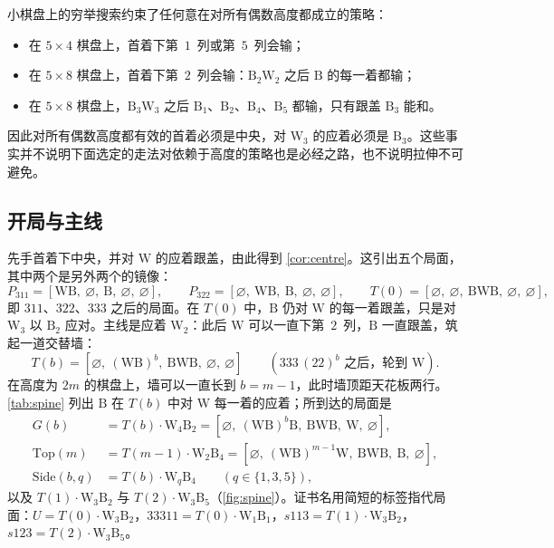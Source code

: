 \documentclass[11pt,a4paper]{article}
\theoremstyle{zhthm}
\newcommand{\B}{\mathrm{B}}
\newcommand{\W}{\mathrm{W}}
\newcommand{\col}[1]{[#1]}
\newcommand{\Top}{\mathrm{Top}}
\newcommand{\Side}{\mathrm{Side}}
\begin{document}
小棋盘上的穷举搜索约束了任何意在对所有偶数高度都成立的策略：
\begin{itemize}
  \item 在 $5\times 4$ 棋盘上，首着下第~$1$~列或第~$5$~列会输；
  \item 在 $5\times 8$ 棋盘上，首着下第~$2$~列会输：$\B_2\W_2$ 之后 $\B$ 的每一着都输；
  \item 在 $5\times 8$ 棋盘上，$\B_3\W_3$ 之后 $\B_1$、$\B_2$、$\B_4$、$\B_5$ 都输，只有跟盖 $\B_3$ 能和。
\end{itemize}
因此对所有偶数高度都有效的首着必须是中央，对 $\W_3$ 的应着必须是 $\B_3$。这些事实并不说明下面选定的走法对依赖于高度的策略也是必经之路，也不说明拉伸不可避免。

\subsection{开局与主线}

先手首着下中央，并对 $\W$ 的应着跟盖，由此得到 \cref{cor:centre}。这引出五个局面，其中两个是另外两个的镜像：
\[
  P_{311}=\col{\W\B,\ \varnothing,\ \B,\ \varnothing,\ \varnothing},\qquad
  P_{322}=\col{\varnothing,\ \W\B,\ \B,\ \varnothing,\ \varnothing},\qquad
  T(0)=\col{\varnothing,\ \varnothing,\ \B\W\B,\ \varnothing,\ \varnothing},
\]
即 $311$、$322$、$333$ 之后的局面。在 $T(0)$ 中，$\B$ 仍对 $\W$ 的每一着跟盖，只是对 $\W_3$ 以 $\B_2$ 应对。主线是应着 $\W_2$：此后 $\W$ 可以一直下第~$2$~列，$\B$ 一直跟盖，筑起一道交替墙：
\[
  T(b)=\col{\varnothing,\ (\W\B)^b,\ \B\W\B,\ \varnothing,\ \varnothing}\qquad(333\,(22)^b \text{ 之后，轮到 } \W).
\]
在高度为 $2m$ 的棋盘上，墙可以一直长到 $b=m-1$，此时墙顶距天花板两行。\cref{tab:spine} 列出 $\B$ 在 $T(b)$ 中对 $\W$ 每一着的应着；所到达的局面是
\begin{align*}
  G(b) &= T(b)\cdot\W_4\B_2 = \col{\varnothing,\ (\W\B)^b\B,\ \B\W\B,\ \W,\ \varnothing},\\
  \Top(m) &= T(m-1)\cdot\W_2\B_4 = \col{\varnothing,\ (\W\B)^{m-1}\W,\ \B\W\B,\ \B,\ \varnothing},\\
  \Side(b,q) &= T(b)\cdot\W_q\B_4\qquad (q\in\{1,3,5\}),
\end{align*}
以及 $T(1)\cdot\W_3\B_2$ 与 $T(2)\cdot\W_3\B_5$（\cref{fig:spine}）。证书名用简短的标签指代局面：$U=T(0)\cdot\W_3\B_2$，$33311=T(0)\cdot\W_1\B_1$，$s113=T(1)\cdot\W_3\B_2$，$s123=T(2)\cdot\W_3\B_5$。
\end{document}
